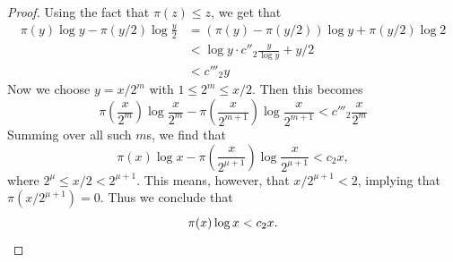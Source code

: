 \begin{proof}
  Using the fact that $\pi(z)\leq z$, we get that
  \begin{equation*}
    \begin{split}
      \pi(y)\log y-\pi(y/2)\log\frac{y}{2}
      & =\left(\pi(y)-\pi(y/2)\right)\log y+\pi(y/2)\log 2 \\
      & < \log y\cdot c''_2\frac{y}{\log y} + y/2 \\
      & <c'''_2y
    \end{split}
  \end{equation*}
  Now we choose $y=x/2^m$ with $1\leq 2^m\leq x/2$. Then this becomes
  \begin{equation*}
    \pi\left(\frac{x}{2^m}\right)\log\frac{x}{2^m}-\pi\left(\frac{x}{2^{m+1}}\right)\log\frac{x}{2^{m+1}}<c'''_2\frac{x}{2^m}
  \end{equation*}
  Summing over all such $m$s, we find that
  \begin{equation*}
    \pi(x)\log x - \pi\left(\frac{x}{2^{\mu+1}}\right)\log\frac{x}{2^{\mu+1}}<c_2x,
  \end{equation*}
  where $2^\mu\leq x/2<2^{\mu+1}$. This means, however, that $x/2^{\mu+1}<2$, implying that $\pi(x/2^{\mu+1})=0$. Thus we conclude that
  \begin{equation*}
    \pi(x)\log x<c_2x.\qedhere
  \end{equation*}
\end{proof}

\endinput

\section{Sums of Reciprocals of Primes}

\begin{theorem}
  The sum
  \begin{equation*}
    \sum_{p}\frac{1}{p}
  \end{equation*}
  diverges.
\end{theorem}

